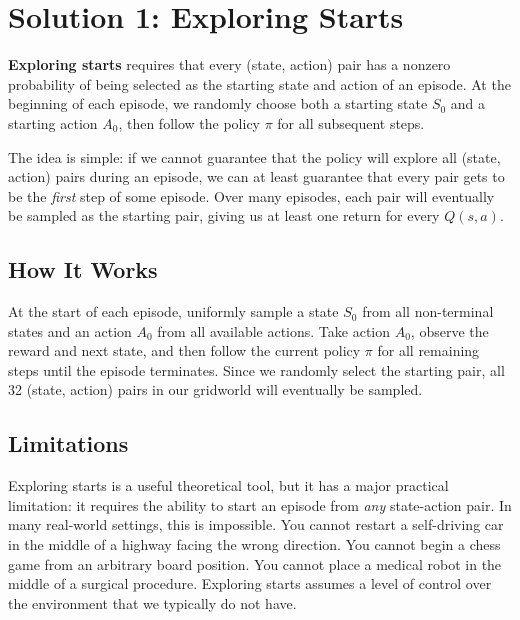 \documentclass[journal, onecolumn]{IEEEtran}
\newcommand{\vocab}[1]{\textbf{\textcolor{Garnet}{#1}}}
\begin{document}
\section{Solution 1: Exploring Starts}

\begin{tcolorbox}[memorybox={Definition: Exploring Starts}]
\vocab{Exploring starts} requires that every (state, action) pair has a nonzero probability of being selected as the starting state and action of an episode. At the beginning of each episode, we randomly choose both a starting state $S_0$ and a starting action $A_0$, then follow the policy $\pi$ for all subsequent steps.
\end{tcolorbox}

The idea is simple: if we cannot guarantee that the policy will explore all (state, action) pairs during an episode, we can at least guarantee that every pair gets to be the \textit{first} step of some episode. Over many episodes, each pair will eventually be sampled as the starting pair, giving us at least one return for every $Q(s,a)$.

\subsection{How It Works}

At the start of each episode, uniformly sample a state $S_0$ from all non-terminal states and an action $A_0$ from all available actions. Take action $A_0$, observe the reward and next state, and then follow the current policy $\pi$ for all remaining steps until the episode terminates. Since we randomly select the starting pair, all 32 (state, action) pairs in our gridworld will eventually be sampled.

\subsection{Limitations}

Exploring starts is a useful theoretical tool, but it has a major practical limitation: it requires the ability to start an episode from \textit{any} state-action pair. In many real-world settings, this is impossible. You cannot restart a self-driving car in the middle of a highway facing the wrong direction. You cannot begin a chess game from an arbitrary board position. You cannot place a medical robot in the middle of a surgical procedure. Exploring starts assumes a level of control over the environment that we typically do not have.
\end{document}
